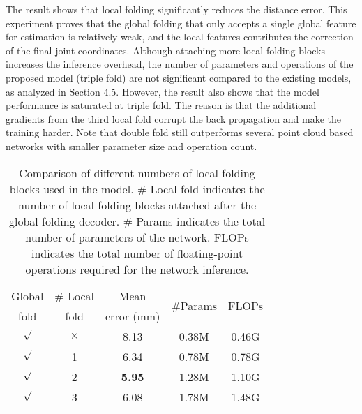 \documentclass[10pt,twocolumn,letterpaper]{article}
\begin{document}
The result shows that local folding significantly reduces the distance error. This experiment proves that the global folding that only accepts a single global feature for estimation is relatively weak, and the local features contributes the correction of the final joint coordinates. 
Although attaching more local folding blocks increases the inference overhead, the number of parameters and operations of the proposed model (triple fold) are not significant compared to the existing models, as analyzed in Section 4.5.
However, the result also shows that the model performance is saturated at triple fold. 
The reason is that the additional gradients from the third local fold corrupt the back propagation and make the training harder.
Note that double fold still outperforms several point cloud based networks with smaller parameter size and operation count. 








\begin{table}[h!]
\small
\begin{center}

\begin{tabular}{cc|ccc}
\hline

Global & \# Local & Mean  & \multirow{2}{*}{\#Params} &  \multirow{2}{*}{FLOPs} \\
fold & fold &  error (mm)&   &  \\
\hline


$\surd$ & $\times$ &  8.13 & 0.38M & 0.46G\\
$\surd$ & 1        &  6.34 & 0.78M & 0.78G\\
$\surd$ & 2        &  \textbf{5.95} & 1.28M & 1.10G\\
$\surd$ & 3        &  6.08 & 1.78M & 1.48G\\
\hline

\end{tabular}
\end{center}
\caption{Comparison of different numbers of local folding blocks used in the model. \# Local fold indicates the number of local folding blocks attached after the global folding decoder. \# Params indicates the total number of parameters of the network. FLOPs indicates the total number of floating-point operations required for the network inference.}
\label{tab:resfoldblock}
\end{table}
\end{document}
